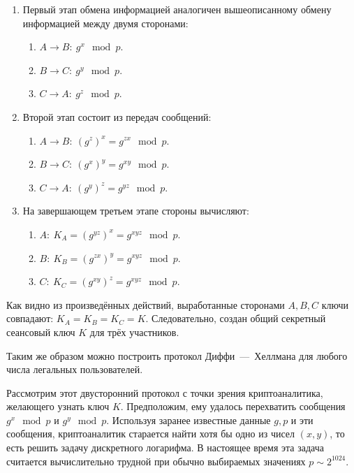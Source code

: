 \begin{enumerate}
    \item Первый этап обмена информацией аналогичен вышеописанному обмену информацией между двумя сторонами:
        \begin{enumerate}
            \item $A \rightarrow B: ~ g^x \mod p$.
            \item $B \rightarrow C: ~ g^y \mod p$.
            \item $C \rightarrow A: ~ g^z \mod p$.
        \end{enumerate}
    \item Второй этап состоит из передач сообщений:
        \begin{enumerate}
            \item $A \rightarrow B: ~ (g^z)^x = g^{zx} \mod p$.
            \item $B \rightarrow C: ~ (g^x)^y = g^{xy} \mod p$.
            \item $C \rightarrow A: ~ (g^y)^z = g^{yz} \mod p$.
        \end{enumerate}
    \item На завершающем третьем этапе стороны вычисляют:
        \begin{enumerate}
            \item $A: ~ K_A = (g^{yz})^x = g^{xyz} \mod p$.
            \item $B: ~ K_B = (g^{zx})^y = g^{xyz} \mod p$.
            \item $C: ~ K_C = (g^{xy})^z = g^{xyz} \mod p$.
        \end{enumerate}
\end{enumerate}

Как видно из произведённых действий, выработанные сторонами $A, B, C$ ключи совпадают: $K_A = K_B = K_C = K$. Следовательно, создан общий секретный сеансовый ключ $K$ для трёх участников.

Таким же образом можно построить протокол Диффи~---~Хеллмана для любого числа легальных пользователей.

Рассмотрим этот двусторонний протокол с точки зрения криптоаналитика, желающего узнать ключ $K$. Предположим, ему удалось перехватить сообщения $g^{x}\mod p$ и $g^{y}\mod p $. Используя заранее известные данные $g,p $ и эти сообщения, криптоаналитик старается найти хотя бы одно из чисел $(x,y)$, то есть решить задачу дискретного логарифма. В настоящее время эта задача считается вычислительно трудной при обычно выбираемых значениях $p\sim 2^{1024}$.

